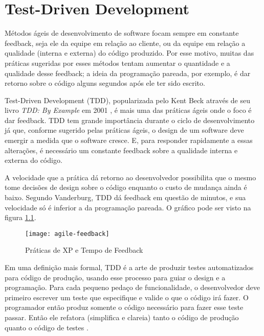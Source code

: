 \chapter{Test-Driven Development}
\label{cap:tdd}

Métodos ágeis de desenvolvimento de software focam sempre em constante
feedback, seja ele da equipe em relação ao cliente, ou da equipe em relação a
qualidade (interna e externa) do código produzido. Por esse motivo, muitas das
práticas sugeridas por esses métodos tentam aumentar o quantidade e a qualidade
desse feedback; a ideia da programação pareada, por exemplo, é dar retorno
sobre o código alguns segundos após ele ter sido escrito.

Test-Driven Development (TDD), popularizada pelo Kent Beck através de seu livro
\textit{TDD: By Example} em 2001 \cite{TDDByExample}, é mais uma das práticas
ágeis onde o foco é dar feedback. TDD tem grande importância durante o ciclo de
desenvolvimento já que, conforme sugerido pelas práticas ágeis, o design de um
software deve emergir a medida que o software cresce. E, para responder
rapidamente a essas alterações, é necessário um constante feedback sobre a
qualidade interna e externa do código.

A velocidade que a prática dá retorno ao desenvolvedor possibilita que o mesmo
tome decisões de design sobre o código enquanto o custo de mudança ainda é
baixo. Segundo Vanderburg, TDD dá feedback em questão de minutos, e sua
velocidade só é inferior a da programação pareada. O gráfico pode ser visto na
figura \ref{fig:agile-feedback}.

\begin{figure}
  \centering
  \texttt{[image: agile-feedback]}
  \caption{Práticas de XP e Tempo de Feedback}
  \label{fig:agile-feedback}
\end{figure}

Em uma definição mais formal, TDD é a arte de produzir testes automatizados para
código de produção, usando esse processo para guiar o design e a programação.
Para cada pequeno pedaço de funcionalidade, o desenvolvedor deve primeiro
escrever um teste que especifique e valide o que o código irá fazer. O
programador então produz somente o código necessário para fazer esse teste
passar. Então ele refatora (simplifica e clareia) tanto o código de produção
quanto o código de testes \cite{agilealliance-tdd} \cite{tdd-taxonomy}.

